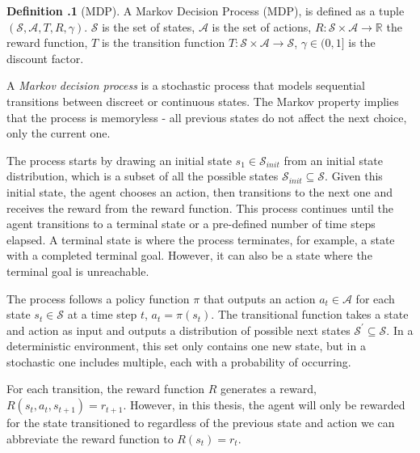 \documentclass[12pt,A4]{report}
\theoremstyle{definition}
\begin{document}
\begin{displayquote}
  \textbf{Definition \thesection.1} (MDP).
  A Markov Decision Process (MDP), is defined as a tuple $(\mathcal{S}, \mathcal{A}, T, R, \gamma)$. $\mathcal{S}$ is the set of states, $\mathcal{A}$ is the set of actions, $R: \mathcal{S} \times \mathcal{A} \rightarrow \mathbb{R}$ the reward function, $T$ is the transition function $T: \mathcal{S} \times \mathcal{A} \rightarrow \mathcal{S}$, $\gamma \in (0, 1]$ is the discount factor.
\end{displayquote}

A \textit{Markov decision process} is a stochastic process that models sequential transitions between discreet or continuous states. The Markov property implies that the process is memoryless - all previous states do not affect the next choice, only the current one. 

The process starts by drawing an initial state $s_1 \in \mathcal{S}_{init}$ from an initial state distribution, which is a subset of all the possible states $\mathcal{S}_{init} \subseteq \mathcal{S}$. Given this initial state, the agent chooses an action, then transitions to the next one and receives the reward from the reward function. This process continues until the agent transitions to a terminal state or a pre-defined number of time steps elapsed. A terminal state is where the process terminates, for example, a state with a completed terminal goal. However, it can also be a state where the terminal goal is unreachable.

The process follows a policy function $\pi$ that outputs an action $a_t \in \mathcal{A}$ for each state $s_t \in \mathcal{S}$ at a time step $t$, $a_t = \pi(s_t)$. The transitional function takes a state and action as input and outputs a distribution of possible next states $\mathcal{S}^\prime \subseteq \mathcal{S}$. In a deterministic environment, this set only contains one new state, but in a stochastic one includes multiple, each with a probability of occurring.

For each transition, the reward function $R$  generates a reward, $R(s_t, a_t, s_{t+1}) = r_{t+1}$. However, in this thesis, the agent will only be rewarded for the state transitioned to regardless of the previous state and action we can abbreviate the reward function to $R(s_t) = r_t$.
\end{document}
